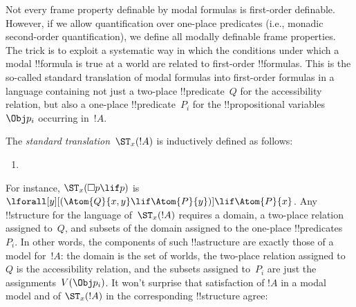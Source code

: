 \documentclass[../../../include/open-logic-section]{subfiles}
\begin{document}

Not every frame property definable by modal formulas is first-order
definable. However, if we allow quantification over one-place
predicates (i.e., monadic second-order quantification), we define all
modally definable frame properties. The trick is to exploit a
systematic way in which the conditions under which a modal !!{formula}
is true at a world are related to first-order !!{formula}s. This is
the so-called standard translation of modal formulas into first-order
formulas in a language containing not just a two-place
!!{predicate}~$Q$ for the accessibility relation, but also a one-place
!!{predicate}~$P_i$ for the !!{propositional variable}s~$\Obj p_i$
occurring in~$!A$.

\begin{defn}
  The \emph{standard translation}~$\ST_x(!A)$ is inductively defined
  as follows:
  \begin{enumerate}
  \item {}
  \end{enumerate}
\end{defn}

For instance, $\ST_x(\Box p \lif p)$ is $\lforall[y][(\Atom{Q}{x,y}
  \lif \Atom{P}{y})] \lif \Atom{P}{x}$. Any !!{structure} for the
language of~$\ST_x(!A)$ requires a domain, a two-place relation
assigned to~$Q$, and subsets of the domain assigned to the one-place
!!{predicate}s~$P_i$. In other words, the components of such
!!a{structure} are exactly those of a model for~$!A$: the domain is
the set of worlds, the two-place relation assigned to~$Q$ is the
accessibility relation, and the subsets assigned to~$P_i$ are just the
assignments~$V(\Obj p_i)$. It won't surprise that satisfaction of $!A$
in a modal model and of $\ST_x(!A)$ in the corresponding !!{structure}
agree:
\end{document}
